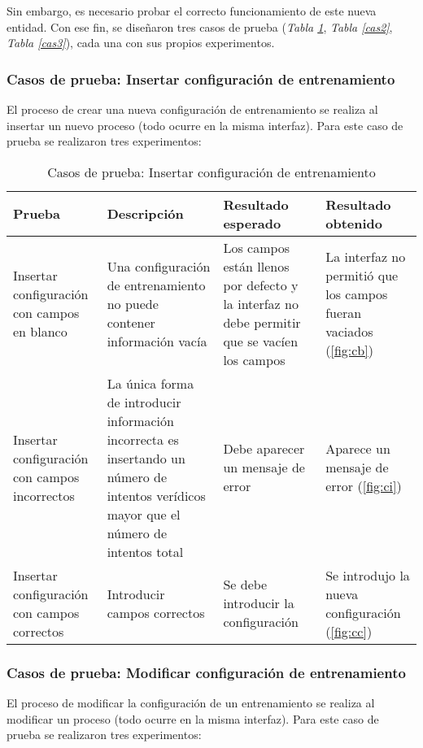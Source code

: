 Sin embargo, es necesario probar el correcto funcionamiento de este nueva entidad. Con ese fin, se diseñaron tres casos de prueba  (\textsl{Tabla \ref{cas1}}, \textsl{Tabla \ref{cas2}}, \textsl{Tabla \ref{cas3}}), cada una con sus propios experimentos. 

\subsubsection{Casos de prueba: Insertar configuración de entrenamiento}
El proceso de crear una nueva configuración de entrenamiento se realiza al insertar un nuevo proceso (todo ocurre en la misma interfaz). Para este caso de prueba se realizaron tres experimentos:

\begin{table}[H]
\begin{center}
\begin{tabular}{ | p{4cm} | p{4cm} | p{3.1cm} | p{3cm} |}
\hline
\centering\textbf{Prueba} & \textbf{Descripción} & \textbf{Resultado \break esperado} & \textbf{Resultado \break obtenido} \\
\hline
Insertar configuración con campos en blanco & Una configuración de entrenamiento no puede contener información vacía & Los campos están llenos por defecto y la interfaz no debe permitir que se vacíen los campos & La interfaz no permitió que los campos fueran vaciados (\ref{fig:cb}) \\
\hline
Insertar configuración con campos incorrectos & La única forma de introducir información incorrecta es insertando un número de intentos verídicos mayor que el número de intentos total & Debe aparecer un mensaje de error & Aparece un mensaje de error (\ref{fig:ci}) \\
\hline
Insertar configuración con campos correctos & Introducir campos correctos & Se debe introducir la configuración  & Se introdujo la nueva configuración (\ref{fig:cc}) \\
\hline
\end{tabular}
\caption{Casos de prueba: Insertar configuración de entrenamiento}
\label{cas1}
\end{center}
\end{table}

\subsubsection{Casos de prueba: Modificar configuración de entrenamiento}
El proceso de modificar la configuración de un entrenamiento se realiza al modificar un proceso (todo ocurre en la misma interfaz). Para este caso de prueba se realizaron tres experimentos:

